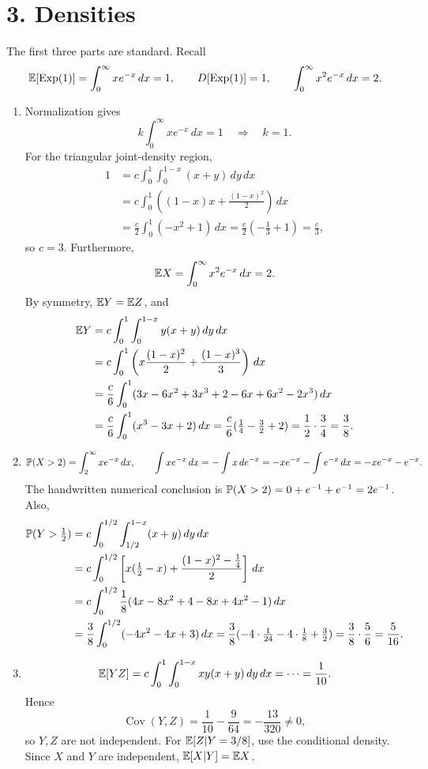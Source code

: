 \documentclass[a4paper]{article}
\begin{document}
\section*{3. Densities}
The first three parts are standard. Recall
\[
\E[\operatorname{Exp}(1)]=\int_0^\infty xe^{-x}\,dx=1,\qquad
D[\operatorname{Exp}(1)]=1,\qquad \int_0^\infty x^2e^{-x}\,dx=2.
\]
\begin{enumerate}
\item Normalization gives
\[
k\int_0^\infty xe^{-x}\,dx=1\quad\Longrightarrow\quad \boxed{k=1}.
\]
For the triangular joint-density region,
\begin{align*}
1&=c\int_0^1\int_0^{1-x}(x+y)\,dy\,dx\\
&=c\int_0^1\left((1-x)x+\frac{(1-x)^2}{2}\right)\,dx\\
&=\frac c2\int_0^1(-x^2+1)\,dx=\frac c2(-\tfrac13+1)=\frac c3,
\end{align*}
so $\boxed{c=3}$. Furthermore,
\[
\E X=\int_0^\infty x^2e^{-x}\,dx=2.
\]
By symmetry, $\E Y=\E Z$, and
\begin{align*}
\E Y&=c\int_0^1\int_0^{1-x}y(x+y)\,dy\,dx\\
&=c\int_0^1\left(x\frac{(1-x)^2}{2}+\frac{(1-x)^3}{3}\right)\,dx\\
&=\frac c6\int_0^1(3x-6x^2+3x^3+2-6x+6x^2-2x^3)\,dx\\
&=\frac c6\int_0^1(x^3-3x+2)\,dx
=\frac c6(\tfrac14-\tfrac32+2)=\frac12\cdot\frac34=\frac38.
\end{align*}
\item
\[
\P(X>2)=\int_2^\infty xe^{-x}\,dx,\qquad
\int xe^{-x}\,dx=-\int x\,de^{-x}=-xe^{-x}-\int e^{-x}\,dx=-xe^{-x}-e^{-x}.
\]
The handwritten numerical conclusion is $\P(X>2)=0+e^{-1}+e^{-1}=2e^{-1}$.
Also,
\begin{align*}
\P(Y>\tfrac12)&=c\int_0^{1/2}\int_{1/2}^{1-x}(x+y)\,dy\,dx\\
&=c\int_0^{1/2}\left[x(\tfrac12-x)+\frac{(1-x)^2-\frac14}{2}\right]\,dx\\
&=c\int_0^{1/2}\frac18(4x-8x^2+4-8x+4x^2-1)\,dx\\
&=\frac38\int_0^{1/2}(-4x^2-4x+3)\,dx
=\frac38(-4\cdot\tfrac1{24}-4\cdot\tfrac18+\tfrac32)
=\frac38\cdot\frac56=\frac5{16}.
\end{align*}
\item
\[
\E[YZ]=c\int_0^1\int_0^{1-x}xy(x+y)\,dy\,dx=\dots=\frac1{10}.
\]
Hence
\[
\operatorname{Cov}(Y,Z)=\frac1{10}-\frac9{64}
=-\frac{13}{320}\neq0,
\]
so $Y,Z$ are not independent. For $\E[Z|Y=3/8]$, use the conditional density. Since $X$ and $Y$ are independent, $\E[X|Y]=\E X$.

\end{enumerate}
\end{document}
